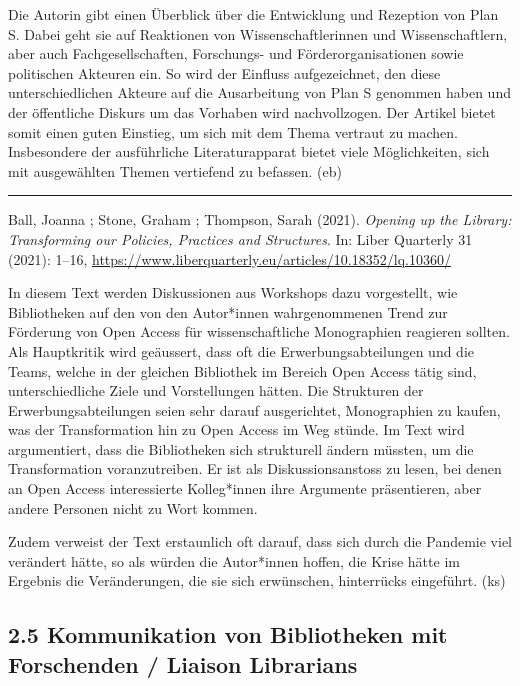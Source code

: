 \documentclass[a4paper,
fontsize=11pt,
oneside,
numbers=noperiodatend,
parskip=half-,
bibliography=totoc,
final
]{scrartcl}
\begin{document}
Die Autorin gibt einen Überblick über die Entwicklung und Rezeption von
Plan S. Dabei geht sie auf Reaktionen von Wissenschaftlerinnen und
Wissenschaftlern, aber auch Fachgesellschaften, Forschungs- und
Förderorganisationen sowie politischen Akteuren ein. So wird der Einfluss
aufgezeichnet, den diese unterschiedlichen Akteure auf die Ausarbeitung
von Plan S genommen haben und der öffentliche Diskurs um das Vorhaben
wird nachvollzogen. Der Artikel bietet somit einen guten Einstieg, um
sich mit dem Thema vertraut zu machen. Insbesondere der ausführliche
Literaturapparat bietet viele Möglichkeiten, sich mit ausgewählten
Themen vertiefend zu befassen. (eb)

\begin{center}\rule{0.5\linewidth}{0.5pt}\end{center}

Ball, Joanna ; Stone, Graham ; Thompson, Sarah (2021). \emph{Opening up
the Library: Transforming our Policies, Practices and Structures}. In:
Liber Quarterly 31 (2021): 1--16,
\url{https://www.liberquarterly.eu/articles/10.18352/lq.10360/}

In diesem Text werden Diskussionen aus Workshops dazu vorgestellt, wie
Bibliotheken auf den von den Autor*innen wahrgenommenen Trend zur
Förderung von Open Access für wissenschaftliche Monographien reagieren
sollten. Als Hauptkritik wird geäussert, dass oft die
Erwerbungsabteilungen und die Teams, welche in der gleichen Bibliothek
im Bereich Open Access tätig sind, unterschiedliche Ziele und
Vorstellungen hätten. Die Strukturen der Erwerbungsabteilungen seien
sehr darauf ausgerichtet, Monographien zu kaufen, was der Transformation
hin zu Open Access im Weg stünde. Im Text wird argumentiert, dass die
Bibliotheken sich strukturell ändern müssten, um die Transformation
voranzutreiben. Er ist als Diskussionsanstoss zu lesen, bei denen an
Open Access interessierte Kolleg*innen ihre Argumente präsentieren, aber
andere Personen nicht zu Wort kommen.

Zudem verweist der Text erstaunlich oft darauf, dass sich durch die
Pandemie viel verändert hätte, so als würden die Autor*innen hoffen, die
Krise hätte im Ergebnis die Veränderungen, die sie sich erwünschen,
hinterrücks eingeführt. (ks)

\hypertarget{kommunikation-von-bibliotheken-mit-forschenden-liaison-librarians}{%
\subsection{2.5 Kommunikation von Bibliotheken mit Forschenden / Liaison
Librarians}\label{kommunikation-von-bibliotheken-mit-forschenden-liaison-librarians}}
\end{document}
